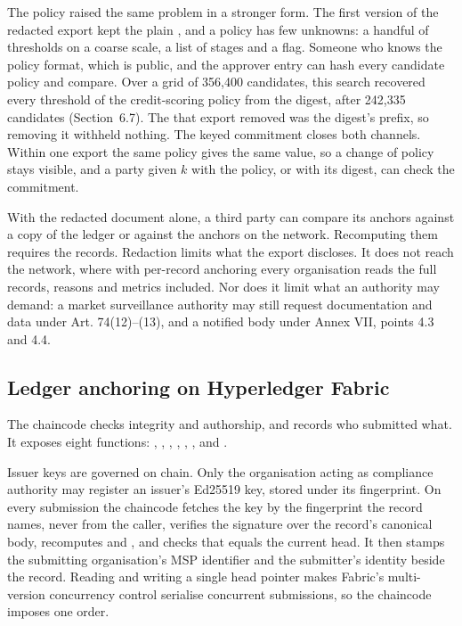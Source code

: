The policy raised the same problem in a stronger form. The first version of the redacted export kept the plain , and a policy has few unknowns: a handful of thresholds on a coarse scale, a list of stages and a flag. Someone who knows the policy format, which is public, and the approver entry can hash every candidate policy and compare. Over a grid of 356,400 candidates, this search recovered every threshold of the credit-scoring policy from the digest, after 242,335 candidates (Section~6.7). The  that export removed was the digest's prefix, so removing it withheld nothing. The keyed commitment closes both channels. Within one export the same policy gives the same value, so a change of policy stays visible, and a party given $k$ with the policy, or with its digest, can check the commitment.

With the redacted document alone, a third party can compare its anchors against a copy of the ledger or against the anchors on the network. Recomputing them requires the records. Redaction limits what the export discloses. It does not reach the network, where with per-record anchoring every organisation reads the full records, reasons and metrics included. Nor does it limit what an authority may demand: a market surveillance authority may still request documentation and data under Art. 74(12)--(13), and a notified body under Annex VII, points 4.3 and 4.4.

\subsection{Ledger anchoring on Hyperledger Fabric}

The chaincode checks integrity and authorship, and records who submitted what. It exposes eight functions: , , , , , ,  and .

Issuer keys are governed on chain. Only the organisation acting as compliance authority may register an issuer's Ed25519 key, stored under its fingerprint. On every submission the chaincode fetches the key by the fingerprint the record names, never from the caller, verifies the signature over the record's canonical body, recomputes  and , and checks that  equals the current head. It then stamps the submitting organisation's MSP identifier and the submitter's identity beside the record. Reading and writing a single head pointer makes Fabric's multi-version concurrency control serialise concurrent submissions, so the chaincode imposes one order.

